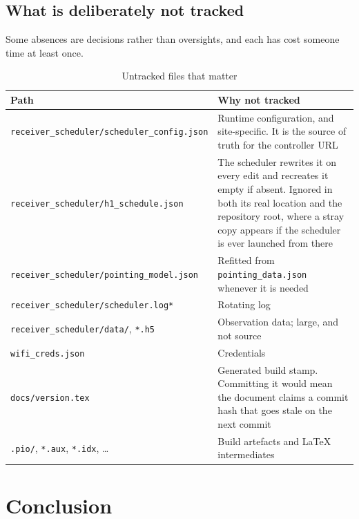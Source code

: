 \documentclass[11pt,a4paper]{article}
\begin{document}
\subsection{What is deliberately not tracked}
\label{sec:untracked}

Some absences are decisions rather than oversights, and each has cost someone time at least once.

\begin{table}[H]
\centering
\caption{Untracked files that matter}
\footnotesize
\begin{tabular}{lp{9.0cm}}
\toprule
\textbf{Path} & \textbf{Why not tracked} \\
\midrule
\texttt{receiver\_scheduler/scheduler\_config.json} & Runtime configuration, and site-specific. It is the source of truth for the controller URL \\
\texttt{receiver\_scheduler/h1\_schedule.json} & The scheduler rewrites it on every edit and recreates it empty if absent. Ignored in both its real location and the repository root, where a stray copy appears if the scheduler is ever launched from there \\
\texttt{receiver\_scheduler/pointing\_model.json} & Refitted from \texttt{pointing\_data.json} whenever it is needed \\
\texttt{receiver\_scheduler/scheduler.log*} & Rotating log \\
\texttt{receiver\_scheduler/data/}, \texttt{*.h5} & Observation data; large, and not source \\
\texttt{wifi\_creds.json} & Credentials \\
\texttt{docs/version.tex} & Generated build stamp. Committing it would mean the document claims a commit hash that goes stale on the next commit \\
\texttt{.pio/}, \texttt{*.aux}, \texttt{*.idx}, \ldots & Build artefacts and \LaTeX{} intermediates \\
\bottomrule
\end{tabular}
\end{table}

\section{Conclusion}
\end{document}
